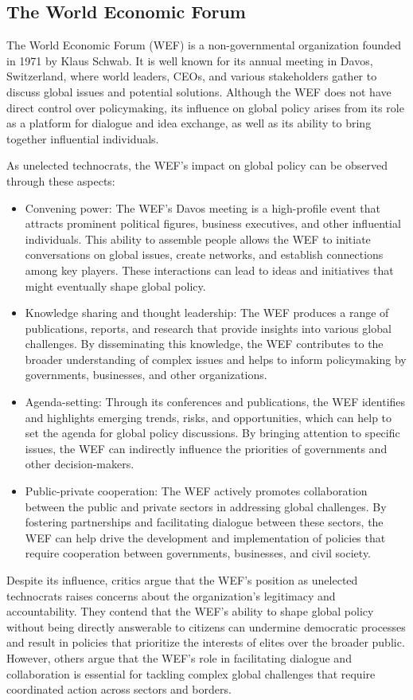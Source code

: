 \subsection{The World Economic Forum}
The World Economic Forum (WEF) is a non-governmental organization founded in 1971 by Klaus Schwab. It is well known for its annual meeting in Davos, Switzerland, where world leaders, CEOs, and various stakeholders gather to discuss global issues and potential solutions. Although the WEF does not have direct control over policymaking, its influence on global policy arises from its role as a platform for dialogue and idea exchange, as well as its ability to bring together influential individuals.\par
As unelected technocrats, the WEF's impact on global policy can be observed through these aspects:
\begin{itemize}
\item Convening power: The WEF's Davos meeting is a high-profile event that attracts prominent political figures, business executives, and other influential individuals. This ability to assemble people allows the WEF to initiate conversations on global issues, create networks, and establish connections among key players. These interactions can lead to ideas and initiatives that might eventually shape global policy.
\item Knowledge sharing and thought leadership: The WEF produces a range of publications, reports, and research that provide insights into various global challenges. By disseminating this knowledge, the WEF contributes to the broader understanding of complex issues and helps to inform policymaking by governments, businesses, and other organizations.
\item Agenda-setting: Through its conferences and publications, the WEF identifies and highlights emerging trends, risks, and opportunities, which can help to set the agenda for global policy discussions. By bringing attention to specific issues, the WEF can indirectly influence the priorities of governments and other decision-makers.
\item Public-private cooperation: The WEF actively promotes collaboration between the public and private sectors in addressing global challenges. By fostering partnerships and facilitating dialogue between these sectors, the WEF can help drive the development and implementation of policies that require cooperation between governments, businesses, and civil society.
\end{itemize}
Despite its influence, critics argue that the WEF's position as unelected technocrats raises concerns about the organization's legitimacy and accountability. They contend that the WEF's ability to shape global policy without being directly answerable to citizens can undermine democratic processes and result in policies that prioritize the interests of elites over the broader public. However, others argue that the WEF's role in facilitating dialogue and collaboration is essential for tackling complex global challenges that require coordinated action across sectors and borders.\par
